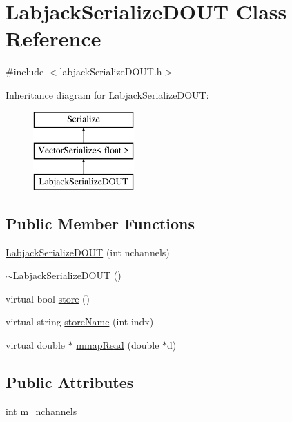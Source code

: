 \hypertarget{classLabjackSerializeDOUT}{\section{Labjack\-Serialize\-D\-O\-U\-T Class Reference}
\label{classLabjackSerializeDOUT}
}


{\ttfamily \#include $<$labjack\-Serialize\-D\-O\-U\-T.\-h$>$}

Inheritance diagram for Labjack\-Serialize\-D\-O\-U\-T\-:\begin{figure}[H]
\begin{center}
\leavevmode
\includegraphics[height=3.000000cm]{classLabjackSerializeDOUT}
\end{center}
\end{figure}
\subsection*{Public Member Functions}
\begin{DoxyCompactItemize}
\item 
\hyperlink{classLabjackSerializeDOUT_a2248473be559c7a1136d52305beb367a}{Labjack\-Serialize\-D\-O\-U\-T} (int nchannels)
\item 
\hyperlink{classLabjackSerializeDOUT_ac6519ba80cc0a5123f59f9d3350911bb}{$\sim$\-Labjack\-Serialize\-D\-O\-U\-T} ()
\item 
virtual bool \hyperlink{classLabjackSerializeDOUT_a2f896d9076b742cbc6fb58faf7cc7b91}{store} ()
\item 
virtual string \hyperlink{classLabjackSerializeDOUT_a814b35d1f45892f684767461d1e8c8a7}{store\-Name} (int indx)
\item 
virtual double $\ast$ \hyperlink{classLabjackSerializeDOUT_a8936d25baa4652bb431b02ccb60489be}{mmap\-Read} (double $\ast$d)
\end{DoxyCompactItemize}
\subsection*{Public Attributes}
\begin{DoxyCompactItemize}
\item 
int \hyperlink{classLabjackSerializeDOUT_afa4c15de49c4dffca161af7f0c8f1099}{m\-\_\-nchannels}
\end{DoxyCompactItemize}


